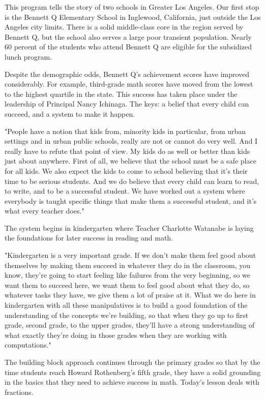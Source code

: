 This program tells the story of two schools in Greater Los Angeles. Our first stop is the Bennett Q Elementary School in Inglewood, California, just outside the Los Angeles city limits. There is a solid middle-class core in the region served by Bennett Q, but the school also serves a large poor transient population. Nearly 60 percent of the students who attend Bennett Q are eligible for the subsidized lunch program.

Despite the demographic odds, Bennett Q's achievement scores have improved considerably. For example, third-grade math scores have moved from the lowest to the highest quartile in the state. This success has taken place under the leadership of Principal Nancy Ichinaga. The keys: a belief that every child can succeed, and a system to make it happen.

"People have a notion that kids from, minority kids in particular, from urban settings and in urban public schools, really are not or cannot do very well. And I really have to refute that point of view. My kids do as well or better than kids just about anywhere. First of all, we believe that the school must be a safe place for all kids. We also expect the kids to come to school believing that it's their time to be serious students. And we do believe that every child can learn to read, to write, and to be a successful student. We have worked out a system where everybody is taught specific things that make them a successful student, and it's what every teacher does."

The system begins in kindergarten where Teacher Charlotte Watanabe is laying the foundations for later success in reading and math.

"Kindergarten is a very important grade. If we don't make them feel good about themselves by making them succeed in whatever they do in the classroom, you know, they're going to start feeling like failures from the very beginning, so we want them to succeed here, we want them to feel good about what they do, so whatever tasks they have, we give them a lot of praise at it. What we do here in kindergarten with all these manipulatives is to build a good foundation of the understanding of the concepts we're building, so that when they go up to first grade, second grade, to the upper grades, they'll have a strong understanding of what exactly they're doing in those grades when they are working with computations."

The building block approach continues through the primary grades so that by the time students reach Howard Rothenberg's fifth grade, they have a solid grounding in the basics that they need to achieve success in math. Today's lesson deals with fractions.

